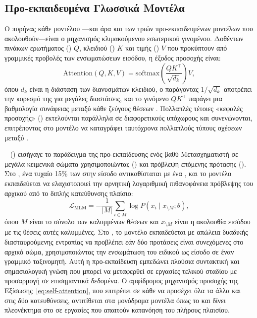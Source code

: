 \subsection{Προ-εκπαιδευμένα Γλωσσικά Μοντέλα}
\label{subsec:pretrained-lms}

Ο πυρήνας κάθε μοντέλου ---και άρα και των τριών προ-εκπαιδευμένων
μοντέλων που ακολουθούν---είναι ο μηχανισμός  κλιμακούμενου
εσωτερικού γινομένου.
Δοθέντων πινάκων ερωτήματος () $Q$, κλειδιού
() $K$ και τιμής () $V$ που προκύπτουν από γραμμικές προβολές
των ενσωματώσεων εισόδου, η έξοδος προσοχής είναι:
\begin{equation}
    \mathrm{Attention}(Q, K, V) = \mathrm{softmax}\!\left(\frac{QK^\top}{\sqrt{d_k}}\right) V,
    \label{eq:self-attention}
\end{equation}
όπου $d_k$ είναι η διάσταση των διανυσμάτων κλειδιού, ο παράγοντας $1/\sqrt{d_k}$
αποτρέπει την κορεσμό της  για μεγάλες διαστάσεις, και το γινόμενο
$QK^\top$ παράγει μια βαθμολογία συνάφειας μεταξύ κάθε ζεύγους θέσεων .
Πολλαπλές τέτοιες «κεφαλές προσοχής» () εκτελούνται
παράλληλα σε διαφορετικούς υπόχωρους και συνενώνονται, επιτρέποντας στο μοντέλο
να καταγράφει ταυτόχρονα πολλαπλούς τύπους σχέσεων μεταξύ .

\textbf{}~\cite{devlin2019bert} () εισήγαγε το παράδειγμα της προ-εκπαίδευσης ενός βαθύ Μετασχηματιστή
σε μεγάλα κειμενικά σώματα χρησιμοποιώντας  ()
και πρόβλεψη επόμενης πρότασης (). Στο , ένα τυχαίο 15\% των 
στην είσοδο αντικαθίσταται με ένα  \texttt{\en{[MASK]}}, και το μοντέλο
εκπαιδεύεται να ελαχιστοποιεί την αρνητική λογαριθμική πιθανοφάνεια πρόβλεψης του
αρχικού  από το διπλής κατεύθυνσης πλαίσιο:
\begin{equation}
    \mathcal{L}_{\mathrm{MLM}} = -\frac{1}{|M|} \sum_{i \in M} \log P(x_i \mid x_{\setminus M}; \theta),
    \label{eq:bert-mlm}
\end{equation}
όπου $M$ είναι το σύνολο των καλυμμένων θέσεων και $x_{\setminus M}$ είναι η
ακολουθία εισόδου με τις θέσεις αυτές καλυμμένες.
Στο , το μοντέλο εκπαιδεύεται με απώλεια δυαδικής διασταυρούμενης εντροπίας
να προβλέπει εάν δύο προτάσεις είναι συνεχόμενες στο αρχικό σώμα, χρησιμοποιώντας
την ενσωμάτωση του ειδικού  \texttt{\en{[CLS]}} ως είσοδο σε έναν
γραμμικό ταξινομητή.
Αυτή η προ-εκπαίδευση εμπεδώνει πλούσια συντακτική και σημασιολογική
γνώση που μπορεί να μεταφερθεί σε εργασίες τελικού σταδίου με προσαρμογή σε επισημαντικά
δεδομένα.
Ο αμφίδρομος μηχανισμός προσοχής της Εξίσωσης~\ref{eq:self-attention}, που επιτρέπει σε κάθε 
να προσέχει όλα τα άλλα  και στις δύο κατευθύνσεις, αντιτίθεται στα
μονόδρομα μοντέλα όπως το  και δίνει πλεονέκτημα στο  σε εργασίες που
απαιτούν κατανόηση του πλήρους πλαισίου.

